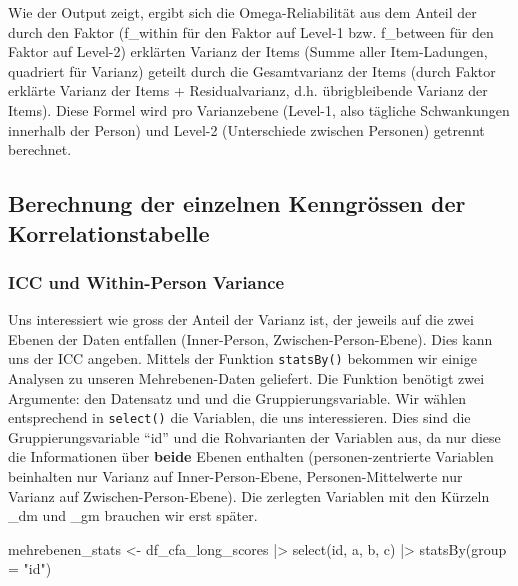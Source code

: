 \documentclass[
  letterpaper,
  DIV=11,
  numbers=noendperiod]{scrreprt}
\newenvironment{Shaded}{\begin{snugshade}}{\end{snugshade}}
\newcommand{\AttributeTok}[1]{\textcolor[rgb]{0.40,0.45,0.13}{#1}}
\newcommand{\FunctionTok}[1]{\textcolor[rgb]{0.28,0.35,0.67}{#1}}
\newcommand{\NormalTok}[1]{\textcolor[rgb]{0.00,0.23,0.31}{#1}}
\newcommand{\OtherTok}[1]{\textcolor[rgb]{0.00,0.23,0.31}{#1}}
\newcommand{\SpecialCharTok}[1]{\textcolor[rgb]{0.37,0.37,0.37}{#1}}
\newcommand{\StringTok}[1]{\textcolor[rgb]{0.13,0.47,0.30}{#1}}
\begin{document}
Wie der Output zeigt, ergibt sich die Omega-Reliabilität aus dem Anteil
der durch den Faktor (f\_within für den Faktor auf Level-1 bzw.
f\_between für den Faktor auf Level-2) erklärten Varianz der Items
(Summe aller Item-Ladungen, quadriert für Varianz) geteilt durch die
Gesamtvarianz der Items (durch Faktor erklärte Varianz der Items +
Residualvarianz, d.h. übrigbleibende Varianz der Items). Diese Formel
wird pro Varianzebene (Level-1, also tägliche Schwankungen innerhalb der
Person) und Level-2 (Unterschiede zwischen Personen) getrennt berechnet.

\subsection{Berechnung der einzelnen Kenngrössen der
Korrelationstabelle}\label{berechnung-der-einzelnen-kenngruxf6ssen-der-korrelationstabelle}

\subsubsection{ICC und Within-Person
Variance}\label{icc-und-within-person-variance}

Uns interessiert wie gross der Anteil der Varianz ist, der jeweils auf
die zwei Ebenen der Daten entfallen (Inner-Person,
Zwischen-Person-Ebene). Dies kann uns der ICC angeben. Mittels der
Funktion \texttt{statsBy()} bekommen wir einige Analysen zu unseren
Mehrebenen-Daten geliefert. Die Funktion benötigt zwei Argumente: den
Datensatz und und die Gruppierungsvariable. Wir wählen entsprechend in
\texttt{select()} die Variablen, die uns interessieren. Dies sind die
Gruppierungsvariable ``id'' und die Rohvarianten der Variablen aus, da
nur diese die Informationen über \textbf{beide} Ebenen enthalten
(personen-zentrierte Variablen beinhalten nur Varianz auf
Inner-Person-Ebene, Personen-Mittelwerte nur Varianz auf
Zwischen-Person-Ebene). Die zerlegten Variablen mit den Kürzeln \_dm und
\_gm brauchen wir erst später.

\begin{Shaded}
\begin{Highlighting}[]
\NormalTok{mehrebenen\_stats }\OtherTok{\textless{}{-}}\NormalTok{ df\_cfa\_long\_scores }\SpecialCharTok{|\textgreater{}} 
  \FunctionTok{select}\NormalTok{(id, a, b, c) }\SpecialCharTok{|\textgreater{}} 
    \FunctionTok{statsBy}\NormalTok{(}\AttributeTok{group =} \StringTok{"id"}\NormalTok{)}
\end{Highlighting}
\end{Shaded}
\end{document}
